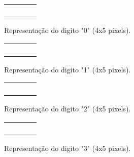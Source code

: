 \begin{figure}[h]
  \centering
  \begin{minipage}{5cm}
    \centering
    \begin{tabular}{|c|c|c|c|}
      \hline
      \W&\B&\B&\W\\ \hline
      \B&\W&\W&\B\\ \hline
      \B&\W&\W&\B\\ \hline
      \B&\W&\W&\B\\ \hline
      \W&\B&\B&\W\\ \hline
    \end{tabular}
  \end{minipage}
  \caption{Representação do digito "0" (4x5 pixels).}
  \label{fig:rep_0}  
\end{figure}
\begin{figure}[h]
  \centering
  \begin{minipage}{5cm}
    \centering
    \begin{tabular}{|c|c|c|c|}
      \hline
      \W&\B&\W&\W\\ \hline
      \B&\B&\W&\W\\ \hline
      \W&\B&\W&\W\\ \hline
      \W&\B&\W&\W\\ \hline
      \B&\B&\B&\W\\ \hline
    \end{tabular}
  \end{minipage}
  \caption{Representação do digito "1" (4x5 pixels).}
  \label{fig:rep_1}  
\end{figure}
\begin{figure}[h]
  \centering
  \begin{minipage}{5cm}
    \centering
    \begin{tabular}{|c|c|c|c|}
      \hline
      \W&\B&\B&\W\\ \hline
      \B&\W&\W&\B\\ \hline
      \W&\W&\B&\W\\ \hline
      \W&\B&\W&\W\\ \hline
      \B&\B&\B&\B\\ \hline
    \end{tabular}
  \end{minipage}
  \caption{Representação do digito "2" (4x5 pixels).}
  \label{fig:rep_2}  
\end{figure}
\begin{figure}[h]
  \centering
  \begin{minipage}{5cm}
    \centering
    \begin{tabular}{|c|c|c|c|}
      \hline
      \B&\B&\B&\W\\ \hline
      \W&\W&\W&\B\\ \hline
      \W&\W&\B&\W\\ \hline
      \W&\W&\W&\B\\ \hline
      \B&\B&\B&\W\\ \hline
    \end{tabular}
  \end{minipage}
  \caption{Representação do digito "3" (4x5 pixels).}
  \label{fig:rep_3}  
\end{figure}

